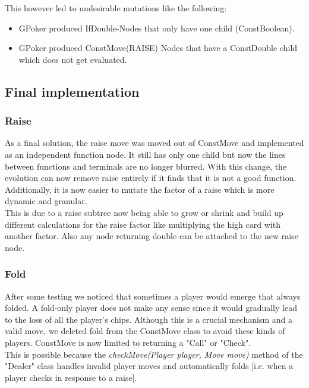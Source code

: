\documentclass[12pt,fleqn,a4paper]{article}
\begin{document}
This however led to undesirable mutations like the following:
\begin{itemize}
	\item GPoker produced IfDouble-Nodes that only have one child
	(ConstBoolean).
	\item GPoker produced ConstMove(RAISE) Nodes that have a
	ConstDouble child which does not get evaluated.
\end{itemize}

\newpage
\subsection{Final implementation}
\subsubsection{Raise}
As a final solution, the raise move was moved out of ConstMove and implemented as an independent function node. It still has only one child but now the lines between functions and terminals are no longer blurred. With this change, the evolution can now remove raise entirely if it finds that it is not a good function. Additionally, it is now easier to mutate the factor of a raise which is more dynamic and granular. \\
This is due to a raise subtree now being able to grow or shrink and build up different calculations for the raise factor like multiplying the high card with another factor. Also any node returning double can be attached to the new raise node.

\subsubsection{Fold}
After some testing we noticed that sometimes a player would emerge that always folded. A fold-only player does not make any sense since it would gradually lead to the loss of all the player's chips. Although this is a crucial mechanism and a valid move, we deleted fold from the ConstMove class to avoid these kinds of players. ConstMove is now limited to returning a "Call" or "Check". \\
This is possible because the \textit{checkMove(Player player, Move move)} method of the "Dealer" class handles invalid player moves and automatically folds [i.e. when a player checks in response to a raise].
\end{document}
